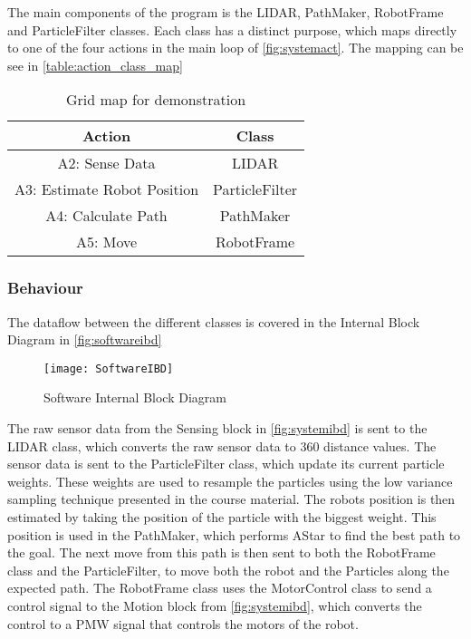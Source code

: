 \documentclass[Main]{subfiles}
\begin{document}
		The main components of the program is the LIDAR, PathMaker, RobotFrame and ParticleFilter classes. 
		Each class has a distinct purpose, which maps directly to one of the four  actions in the main loop of \autoref{fig:systemact}.
		The mapping can be see in \autoref{table:action_class_map}
		 
		\begin{table}[H]
			\centering
			\begin{tabular}{|c|c|}
			\hline
				Action & Class \\ 
			\hline
				A2: Sense Data & LIDAR  \\ 
			\hline
				A3: Estimate Robot Position & ParticleFilter  \\ 
			\hline
				A4: Calculate Path & PathMaker  \\ 
			\hline
				A5: Move & RobotFrame  \\ 
			\hline
			\end{tabular}
			\caption{Grid map for demonstration}
			\label{table:action_class_map} 
		\end{table} \noindent
		
	\subsubsection{Behaviour} %
	\label{subsub:software_behaviour}

		The dataflow between the different classes is covered in the Internal Block Diagram in \autoref{fig:softwareibd}
		
		\begin{figure}[H]
			\centering
			\texttt{[image: SoftwareIBD]}
			\caption{Software Internal Block Diagram}
			\label{fig:softwareibd}
		\end{figure}

		The raw sensor data from the Sensing block in \autoref{fig:systemibd} is sent to the LIDAR class, which  converts the raw sensor data to 360 distance values.
		The sensor data is sent to the ParticleFilter class, which update its current particle weights. 
		These weights are used to resample the particles using the low variance sampling technique presented in the course material.
		The robots position is then estimated by taking the position of the particle with the biggest weight.
		This position is used in the PathMaker, which performs AStar to find the best path to the goal. The next move from this path is then sent to both the RobotFrame class and the ParticleFilter, to move both the robot and the Particles along the expected path.
		The RobotFrame class uses the MotorControl class to send a control signal to the Motion block from \autoref{fig:systemibd}, which converts the control to a PMW signal that controls the motors of the robot.
		
\end{document}
